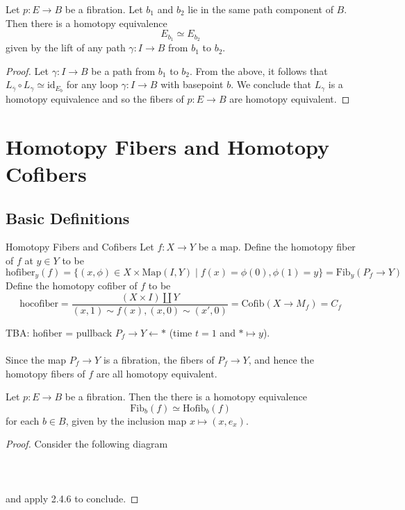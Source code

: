 \documentclass[a4paper]{article}
\begin{document}
\begin{thm}{}{} Let $p:E\to B$ be a fibration. Let $b_1$ and $b_2$ lie in the same path component of $B$. Then there is a homotopy equivalence $$E_{b_1}\simeq E_{b_2}$$ given by the lift of any path $\gamma:I\to B$ from $b_1$ to $b_2$. \tcbline
\begin{proof}
Let $\gamma:I\to B$ be a path from $b_1$ to $b_2$. From the above, it follows that $L_{\overline{\gamma}}\circ L_\gamma\simeq\text{id}_{E_b}$ for any loop $\gamma:I\to B$ with basepoint $b$. We conclude that $L_\gamma$ is a homotopy equivalence and so the fibers of $p:E\to B$ are homotopy equivalent. 
\end{proof}
\end{thm}

\pagebreak
\section{Homotopy Fibers and Homotopy Cofibers}
\subsection{Basic Definitions}
\begin{defn}{Homotopy Fibers and Cofibers}{} Let $f:X\to Y$ be a map. Define the homotopy fiber of $f$ at $y\in Y$ to be $$\text{hofiber}_y(f)=\{(x,\phi)\in X\times\text{Map}(I,Y)\;|\;f(x)=\phi(0), \phi(1)=y\}=\text{Fib}_y(P_f\to Y)$$ Define the homotopy cofiber of $f$ to be $$\text{hocofiber}=\frac{(X\times I)\amalg Y}{(x,1)\sim f(x),(x,0)\sim(x',0)}=\text{Cofib}(X\to M_f)=C_f$$
\end{defn}

TBA: hofiber = pullback $P_f\to Y\leftarrow\ast$ (time $t=1$ and $\ast\mapsto y$). \\~\\

Since the map $P_f\to Y$ is a fibration, the fibers of $P_f\to Y$, and hence the homotopy fibers of $f$ are all homotopy equivalent. 

\begin{prp}{}{} Let $p:E\to B$ be a fibration. Then the there is a homotopy equivalence $$\text{Fib}_b(f)\simeq\text{Hofib}_b(f)$$ for each $b\in B$, given by the inclusion map $x\mapsto(x,e_x)$. \tcbline
\begin{proof}
Consider the following diagram \\~\\
 \\~\\
and apply 2.4.6 to conclude. 
\end{proof}
\end{prp}
\end{document}
